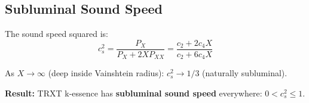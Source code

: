 \subsection{Subluminal Sound Speed}

The sound speed squared is:
\begin{equation}
    c_s^2 = \frac{P_X}{P_X + 2X P_{XX}} = \frac{c_2 + 2c_4 X}{c_2 + 6c_4 X}
\end{equation}

As $X \to \infty$ (deep inside Vainshtein radius): $c_s^2 \to 1/3$ (naturally subluminal).

\begin{mdframed}[backgroundcolor=green!10]
\textbf{Result:} TRXT k-essence has \textbf{subluminal sound speed} everywhere: $0 < c_s^2 \leq 1$.
\end{mdframed}
